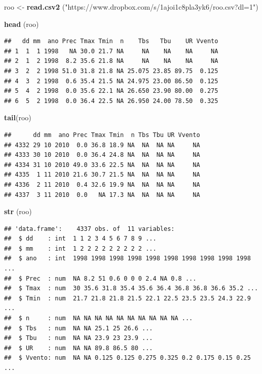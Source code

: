 \documentclass[
]{book}
\newenvironment{Shaded}{\begin{snugshade}}{\end{snugshade}}
\newcommand{\KeywordTok}[1]{\textcolor[rgb]{0.13,0.29,0.53}{\textbf{#1}}}
\newcommand{\NormalTok}[1]{#1}
\newcommand{\StringTok}[1]{\textcolor[rgb]{0.31,0.60,0.02}{#1}}
\begin{document}
\begin{Shaded}
\begin{Highlighting}[]
\NormalTok{roo <-}\StringTok{ }\KeywordTok{read.csv2}\NormalTok{ (}\StringTok{"https://www.dropbox.com/s/1ajoi1c8pla3yk6/roo.csv?dl=1"}\NormalTok{)}

\KeywordTok{head}\NormalTok{ (roo)}
\end{Highlighting}
\end{Shaded}

\begin{verbatim}
##   dd mm  ano Prec Tmax Tmin  n    Tbs   Tbu    UR Vvento
## 1  1  1 1998   NA 30.0 21.7 NA     NA    NA    NA     NA
## 2  1  2 1998  8.2 35.6 21.8 NA     NA    NA    NA     NA
## 3  2  2 1998 51.0 31.8 21.8 NA 25.075 23.85 89.75  0.125
## 4  3  2 1998  0.6 35.4 21.5 NA 24.975 23.00 86.50  0.125
## 5  4  2 1998  0.0 35.6 22.1 NA 26.650 23.90 80.00  0.275
## 6  5  2 1998  0.0 36.4 22.5 NA 26.950 24.00 78.50  0.325
\end{verbatim}

\begin{Shaded}
\begin{Highlighting}[]
\KeywordTok{tail}\NormalTok{(roo)}
\end{Highlighting}
\end{Shaded}

\begin{verbatim}
##      dd mm  ano Prec Tmax Tmin  n Tbs Tbu UR Vvento
## 4332 29 10 2010  0.0 36.8 18.9 NA  NA  NA NA     NA
## 4333 30 10 2010  0.0 36.4 24.8 NA  NA  NA NA     NA
## 4334 31 10 2010 49.0 33.6 22.5 NA  NA  NA NA     NA
## 4335  1 11 2010 21.6 30.7 21.5 NA  NA  NA NA     NA
## 4336  2 11 2010  0.4 32.6 19.9 NA  NA  NA NA     NA
## 4337  3 11 2010  0.0   NA 17.3 NA  NA  NA NA     NA
\end{verbatim}

\begin{Shaded}
\begin{Highlighting}[]
\KeywordTok{str}\NormalTok{ (roo)}
\end{Highlighting}
\end{Shaded}

\begin{verbatim}
## 'data.frame':    4337 obs. of  11 variables:
##  $ dd    : int  1 1 2 3 4 5 6 7 8 9 ...
##  $ mm    : int  1 2 2 2 2 2 2 2 2 2 ...
##  $ ano   : int  1998 1998 1998 1998 1998 1998 1998 1998 1998 1998 ...
##  $ Prec  : num  NA 8.2 51 0.6 0 0 0 2.4 NA 0.8 ...
##  $ Tmax  : num  30 35.6 31.8 35.4 35.6 36.4 36.8 36.8 36.6 35.2 ...
##  $ Tmin  : num  21.7 21.8 21.8 21.5 22.1 22.5 23.5 23.5 24.3 22.9 ...
##  $ n     : num  NA NA NA NA NA NA NA NA NA NA ...
##  $ Tbs   : num  NA NA 25.1 25 26.6 ...
##  $ Tbu   : num  NA NA 23.9 23 23.9 ...
##  $ UR    : num  NA NA 89.8 86.5 80 ...
##  $ Vvento: num  NA NA 0.125 0.125 0.275 0.325 0.2 0.175 0.15 0.25 ...
\end{verbatim}
\end{document}
